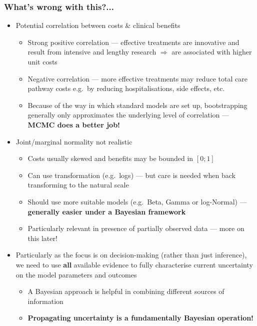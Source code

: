 \begin{frame}[label={whatswrong}]
\frametitle{What's wrong with this?...}
\begin{itemize}
\item Potential correlation between costs \& clinical benefits \hfill{}
\begin{itemize}
\item Strong positive correlation --- effective treatments are innovative and result from intensive and lengthy research $\Rightarrow$ are associated with higher unit costs
\item Negative correlation --- more effective treatments may reduce total care pathway costs e.g.\ by reducing hospitalisations, side effects, etc.
\item Because of the way in which standard models are set up, bootstrapping generally only approximates the underlying level of correlation --- \textbf{\olive MCMC does a better job!}
\end{itemize}
\vspace{10pt}\pause
\item Joint/marginal normality not realistic \hfill{}
\begin{itemize}
\item Costs usually skewed and benefits may be bounded in $[0;1]$
\item Can use transformation (e.g.\ logs) --- but care is needed when back transforming to the natural scale
\item Should use more suitable models (e.g.\ Beta, Gamma or log-Normal) --- \textbf{\olive generally easier under a Bayesian framework}
\item Particularly relevant in presence of partially observed data --- more on this later!
\end{itemize}
\vspace{10pt}\pause
\item Particularly as the focus is on decision-making (rather than just inference), we need to use \textbf{all} available evidence to fully characterise current uncertainty on the model parameters and outcomes \hfill{}
\begin{itemize}
\item A Bayesian approach is helpful in combining different sources of information
\item \textbf{\olive Propagating uncertainty is a fundamentally Bayesian operation!}
\end{itemize}
\end{itemize}
\end{frame}



